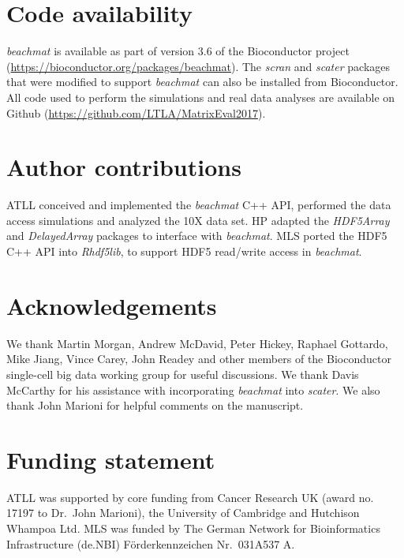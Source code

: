 \documentclass[10pt,letterpaper]{article}
\newcommand{\beachmat}{\textit{beachmat}}
\begin{document}
\section*{Code availability}
\beachmat{} is available as part of version 3.6 of the Bioconductor project (\url{https://bioconductor.org/packages/beachmat}).
The \textit{scran} and \textit{scater} packages that were modified to support \beachmat{} can also be installed from Bioconductor.
All code used to perform the simulations and real data analyses are available on Github (\url{https://github.com/LTLA/MatrixEval2017}).

\section*{Author contributions}
ATLL conceived and implemented the \beachmat{} C++ API, performed the data access simulations and analyzed the 10X data set.
HP adapted the \textit{HDF5Array} and \textit{DelayedArray} packages to interface with \beachmat{}.
MLS ported the HDF5 C++ API into \textit{Rhdf5lib}, to support HDF5 read/write access in \beachmat{}.

\section*{Acknowledgements}
We thank Martin Morgan, Andrew McDavid, Peter Hickey, Raphael Gottardo, Mike Jiang, Vince Carey, John Readey and other members of the Bioconductor single-cell big data working group for useful discussions.
We thank Davis McCarthy for his assistance with incorporating \beachmat{} into \textit{scater}.
We also thank John Marioni for helpful comments on the manuscript.

\section*{Funding statement}
ATLL was supported by core funding from Cancer Research UK (award no. 17197 to Dr.\ John Marioni), the University of Cambridge and Hutchison Whampoa Ltd.
MLS was funded by The German Network for Bioinformatics Infrastructure (de.NBI) F\"orderkennzeichen Nr.\ 031A537 A.


\end{document}
